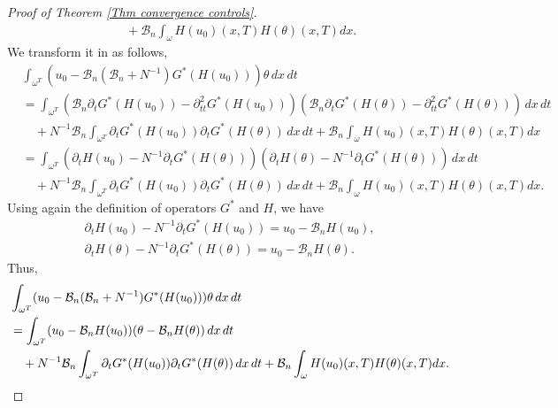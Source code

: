 \documentclass[reqno]{amsart}
\begin{document}
\begin{proof}[Proof of Theorem \ref{Thm convergence controls}]
\begin{align*}
&\quad +\mathcal{B}_n\int _{\omega }H(u_0)(x,T) H(\theta)(x,T){dx}.
\end{align*}
We transform it in as follows,
\begin{align*}
&\int _{\omega ^{T}}(u_0-\mathcal{B}_n(\mathcal{B}%
_n+N^{-1})G^{\ast }(H(u_0)))\theta \,dx\,dt \\
&= \int _{\omega ^{T}}(\mathcal{B}_n\partial _{t}G^{\ast
}(H(u_0))-\partial _{tt}^2G^{\ast }(H(u_0)))(\mathcal{B}_n\partial
_{t}G^{\ast }(H(\theta))-\partial _{tt}^2G^{\ast }(H(\theta)))\,dx\,dt \\
&\quad + N^{-1}\mathcal{B}_n\int _{\omega ^{T}}\partial _{t}G^{\ast
}(H(u_0)) \partial _{t}G^{\ast }(H(\theta))\,dx\,dt +\mathcal{B}_n\int
_{\omega }H(u_0)(x,T) H(\theta)(x,T){dx} \\
&= \int _{\omega ^{T}}(\partial _{t}H(u_0)-N^{-1}\partial
_{t}G^{\ast }(H(\theta))) (\partial _{t}H(\theta)-N^{-1}\partial _{t}G^{\ast
}(H(\theta)))\,dx\,dt \\
&\quad + N^{-1}\mathcal{B}_n\int _{\omega ^{T}}\partial _{t}G^{\ast
}(H(u_0)) \partial _{t}G^{\ast }(H(\theta))\,dx\,dt +\mathcal{B}_n\int
_{\omega }H(u_0)(x,T) H(\theta)(x,T){dx}.
\end{align*}
Using again the definition of operators $G^{\ast }$ and $H$, we have
\begin{gather*}
\partial _{t}H(u_0)-N^{-1}\partial _{t}G^{\ast }(H(u_0))=u_0-\mathcal{B%
}_nH(u_0), \\
\partial _{t}H(\theta)-N^{-1}\partial _{t}G^{\ast }(H(\theta))=u_0-%
\mathcal{B}_nH(\theta).
\end{gather*}
Thus,
\begin{equation}
\begin{aligned}
&\int _{\omega ^{T}}(u_0-\mathcal{B}_n(\mathcal{B}%
_n+N^{-1})G^{\ast }(H(u_0)))\theta\,dx\,dt    \\
&=\int _{\omega ^{T}}(u_0-\mathcal{B}_nH(u_0))(\theta - \mathcal{%
B}_nH(\theta))\,dx\,dt    \\
&\quad + N^{-1}\mathcal{B}_n\int _{\omega ^{T}}\partial _{t}G^{\ast
}(H(u_0)) \partial _{t}G^{\ast }(H(\theta))\,dx\,dt
+\mathcal{B}_n\int_{\omega }H(u_0)(x,T) H(\theta)(x,T){dx}.
\end{aligned}  \label{theta and u rel 1}
\end{equation}


\end{proof}
\end{document}
